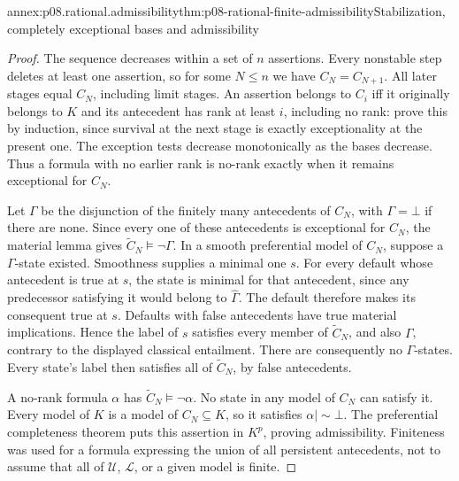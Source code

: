 \begin{annexitem}{annex:p08.rational.admissibility}{thm:p08-rational-finite-admissibility}{Stabilization, completely exceptional bases and admissibility}
\begin{proof}
The sequence decreases within a set of \(n\) assertions. Every
nonstable step deletes at least one assertion, so for some \(N\leq n\)
we have \(C_N=C_{N+1}\). All later stages equal \(C_N\), including
limit stages. An assertion belongs to \(C_i\) iff it originally
belongs to \(K\) and its antecedent has rank at least \(i\),
including no rank: prove this by induction, since survival at the
next stage is exactly exceptionality at the present one.
The exception tests decrease monotonically as the bases decrease.
Thus a formula with no earlier rank is no-rank exactly when it remains
exceptional for \(C_N\).

Let \(\Gamma\) be the disjunction of the finitely many antecedents
of \(C_N\), with \(\Gamma=\bot\) if there are none.
Since every one of these antecedents is exceptional for \(C_N\),
the material lemma gives
\(\widetilde C_N\models\neg\Gamma\).
In a smooth preferential model of \(C_N\), suppose a
\(\Gamma\)-state existed. Smoothness supplies a minimal one
\(s\). For every default whose antecedent is true at \(s\),
the state is minimal for that antecedent, since any predecessor
satisfying it would belong to \(\widehat\Gamma\). The default
therefore makes its consequent true at \(s\). Defaults with false
antecedents have true material implications. Hence the label of
\(s\) satisfies every member of \(\widetilde C_N\), and also
\(\Gamma\), contrary to the displayed classical entailment.
There are consequently no \(\Gamma\)-states. Every state's label
then satisfies all of \(\widetilde C_N\), by false antecedents.

A no-rank formula \(\alpha\) has
\(\widetilde C_N\models\neg\alpha\). No state in any model
of \(C_N\) can satisfy it. Every model of \(K\) is a model of
\(C_N\subseteq K\), so it satisfies
\(\alpha\mathrel{|\!\sim}\bot\).
The preferential completeness theorem puts this assertion in \(K^p\),
proving admissibility. Finiteness was used for a formula expressing the
union of all persistent antecedents, not to assume that all of
\(\mathcal U\), \(\mathcal L\), or a given model is finite.
\end{proof}
\end{annexitem}

